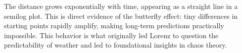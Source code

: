 \documentclass[12pt]{article}
\begin{document}
The distance grows exponentially with time, appearing as a straight line in a semilog plot. This is direct evidence of the butterfly effect: tiny differences in starting points rapidly amplify, making long-term predictions practically impossible. This behavior is what originally led Lorenz to question the predictability of weather and led to foundational insights in chaos theory.
\end{document}
